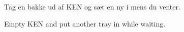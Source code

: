 \documentclass{article}
\begin{document}
\maketitle

\null
\vspace{-0.5cm}


\begin{center}
  
\huge Tag en bakke ud af KEN og sæt en ny i mens du venter.\\

\end{center}

\english


\begin{center}
  
\huge Empty KEN and put another tray in while waiting.\\

\end{center}

\dansk

\underskriv
\end{document}

